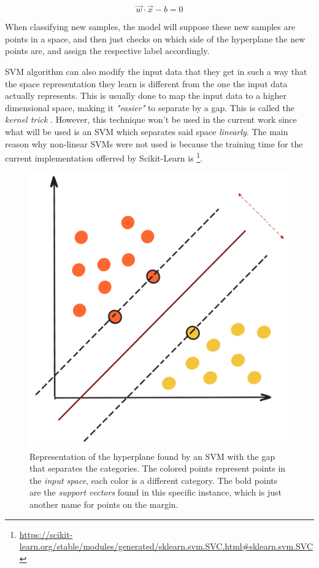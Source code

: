 \documentclass[epsfig,a4paper,11pt,titlepage,twoside,openany]{book}
\newcommand{\footurl}[1]{\footnote{\url{#1}}}
\begin{document}
\begin{equation*}
    \vec{w} \cdot \vec{x} - b = 0
\end{equation*}

When classifying new samples, the model will suppose these new samples are points in a space, and then just checks on which side of the hyperplane the new points are, and assign the respective label accordingly. 

SVM algorithm can also modify the input data that they get in such a way that the space representation they learn is different from the one the input data actually represents. This is usually done to map the input data to a higher dimensional space, making it \textit{"easier"} to separate by a gap. This is called the \textit{kernel trick} \cite{Cristianini2000_svm, Boser:1992_kernel_trick}. However, this technique won't be used in the current work since what will be used is an SVM which separates said space \textit{linearly}. The main reason why non-linear SVMs were not used is because the training time for the current implementation offerred by Scikit-Learn is \footurl{https://scikit-learn.org/stable/modules/generated/sklearn.svm.SVC.html\#sklearn.svm.SVC}.

\begin{figure}[H]
  \centering \includegraphics[width=.5\textwidth]{svm_gap_image} 
  \caption{Representation of the hyperplane found by an SVM with the gap that separates the categories. The colored points represent points in the \textit{input space}, each color is a different category. The bold points are the \textit{support vectors} found in this specific instance, which is just another name for points on the margin.}
  \label{fig:svm-hyperplan-and-gap}
\end{figure}
\end{document}
